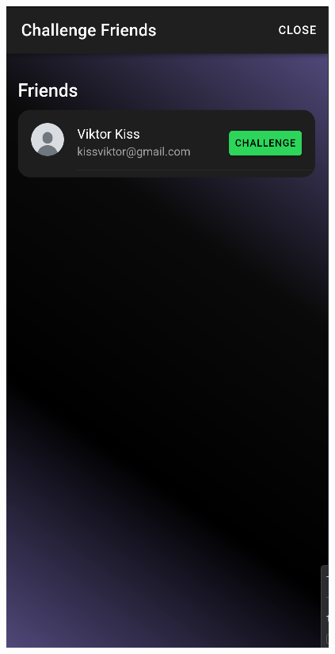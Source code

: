 \documentclass[12pt]{report}
\begin{document}
\begin{figure}[H]
\begin{minipage}[b]{0.25\textwidth}
        \includegraphics[width=\linewidth]{src/challenge1.png}
    \end{minipage}
    \hfill
    \begin{minipage}[b]{0.25\textwidth}

\end{minipage}
\end{figure}
\end{document}
